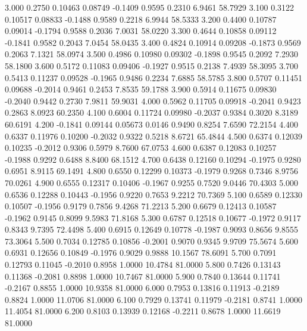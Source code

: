    3.000   0.2750   0.10463   0.08749  -0.1409   0.9595   0.2310   6.9461  58.7929
   3.100   0.3122   0.10517   0.08833  -0.1488   0.9589   0.2218   6.9944  58.5333
   3.200   0.4400   0.10787   0.09014  -0.1794   0.9588   0.2036   7.0031  58.0220
   3.300   0.4644   0.10858   0.09112  -0.1841   0.9582   0.2043   7.0454  58.0435
   3.400   0.4824   0.10914   0.09208  -0.1873   0.9569   0.2063   7.1321  58.0974
   3.500   0.4986   0.10980   0.09302  -0.1898   0.9545   0.2092   7.2930  58.1800
   3.600   0.5172   0.11083   0.09406  -0.1927   0.9515   0.2138   7.4939  58.3095
   3.700   0.5413   0.11237   0.09528  -0.1965   0.9486   0.2234   7.6885  58.5785
   3.800   0.5707   0.11451   0.09688  -0.2014   0.9461   0.2453   7.8535  59.1788
   3.900   0.5914   0.11675   0.09830  -0.2040   0.9442   0.2730   7.9811  59.9031
   4.000   0.5962   0.11705   0.09918  -0.2041   0.9423   0.2863   8.0923  60.2350
   4.100   0.6004   0.11724   0.09980  -0.2037   0.9384   0.3020   8.3189  60.6191
   4.200  -0.1841   0.09144   0.05673   0.0146   0.9490   0.8254   7.6590  72.2154
   4.400   0.6337   0.11976   0.10200  -0.2032   0.9322   0.5218   8.6721  65.4844
   4.500   0.6374   0.12039   0.10235  -0.2012   0.9306   0.5979   8.7600  67.0753
   4.600   0.6387   0.12083   0.10257  -0.1988   0.9292   0.6488   8.8400  68.1512
   4.700   0.6438   0.12160   0.10294  -0.1975   0.9280   0.6951   8.9115  69.1491
   4.800   0.6550   0.12299   0.10373  -0.1979   0.9268   0.7346   8.9756  70.0261
   4.900   0.6555   0.12317   0.10406  -0.1967   0.9255   0.7520   9.0446  70.4303
   5.000   0.6536   0.12288   0.10443  -0.1956   0.9220   0.7653   9.2212  70.7369
   5.100   0.6589   0.12330   0.10507  -0.1956   0.9179   0.7856   9.4268  71.2213
   5.200   0.6679   0.12413   0.10587  -0.1962   0.9145   0.8099   9.5983  71.8168
   5.300   0.6787   0.12518   0.10677  -0.1972   0.9117   0.8343   9.7395  72.4498
   5.400   0.6915   0.12649   0.10778  -0.1987   0.9093   0.8656   9.8555  73.3064
   5.500   0.7034   0.12785   0.10856  -0.2001   0.9070   0.9345   9.9709  75.5674
   5.600   0.6931   0.12656   0.10849  -0.1976   0.9029   0.9888  10.1567  78.6091
   5.700   0.7091   0.12793   0.11045  -0.2010   0.8958   1.0000  10.4784  81.0000
   5.800   0.7426   0.13143   0.11368  -0.2081   0.8898   1.0000  10.7467  81.0000
   5.900   0.7840   0.13644   0.11741  -0.2167   0.8855   1.0000  10.9358  81.0000
   6.000   0.7953   0.13816   0.11913  -0.2189   0.8824   1.0000  11.0706  81.0000
   6.100   0.7929   0.13741   0.11979  -0.2181   0.8741   1.0000  11.4054  81.0000
   6.200   0.8103   0.13939   0.12168  -0.2211   0.8678   1.0000  11.6619  81.0000
